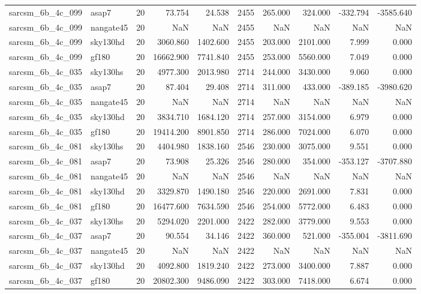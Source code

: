 \documentclass{article}
\begin{document}
\begin{longtable}{llrrrrrrrr}
sarcsm\_6b\_4c\_099 & asap7 & 20 & 73.754 & 24.538 & 2455 & 265.000 & 324.000 & -332.794 & -3585.640 \\
sarcsm\_6b\_4c\_099 & nangate45 & 20 & NaN & NaN & 2455 & NaN & NaN & NaN & NaN \\
sarcsm\_6b\_4c\_099 & sky130hd & 20 & 3060.860 & 1402.600 & 2455 & 203.000 & 2101.000 & 7.999 & 0.000 \\
sarcsm\_6b\_4c\_099 & gf180 & 20 & 16662.900 & 7741.840 & 2455 & 253.000 & 5560.000 & 7.049 & 0.000 \\
sarcsm\_6b\_4c\_035 & sky130hs & 20 & 4977.300 & 2013.980 & 2714 & 244.000 & 3430.000 & 9.060 & 0.000 \\
sarcsm\_6b\_4c\_035 & asap7 & 20 & 87.404 & 29.408 & 2714 & 311.000 & 433.000 & -389.185 & -3980.620 \\
sarcsm\_6b\_4c\_035 & nangate45 & 20 & NaN & NaN & 2714 & NaN & NaN & NaN & NaN \\
sarcsm\_6b\_4c\_035 & sky130hd & 20 & 3834.710 & 1684.120 & 2714 & 257.000 & 3154.000 & 6.979 & 0.000 \\
sarcsm\_6b\_4c\_035 & gf180 & 20 & 19414.200 & 8901.850 & 2714 & 286.000 & 7024.000 & 6.070 & 0.000 \\
sarcsm\_6b\_4c\_081 & sky130hs & 20 & 4404.980 & 1838.160 & 2546 & 230.000 & 3075.000 & 9.551 & 0.000 \\
sarcsm\_6b\_4c\_081 & asap7 & 20 & 73.908 & 25.326 & 2546 & 280.000 & 354.000 & -353.127 & -3707.880 \\
sarcsm\_6b\_4c\_081 & nangate45 & 20 & NaN & NaN & 2546 & NaN & NaN & NaN & NaN \\
sarcsm\_6b\_4c\_081 & sky130hd & 20 & 3329.870 & 1490.180 & 2546 & 220.000 & 2691.000 & 7.831 & 0.000 \\
sarcsm\_6b\_4c\_081 & gf180 & 20 & 16477.600 & 7634.590 & 2546 & 254.000 & 5772.000 & 6.483 & 0.000 \\
sarcsm\_6b\_4c\_037 & sky130hs & 20 & 5294.020 & 2201.000 & 2422 & 282.000 & 3779.000 & 9.553 & 0.000 \\
sarcsm\_6b\_4c\_037 & asap7 & 20 & 90.554 & 34.146 & 2422 & 360.000 & 521.000 & -355.004 & -3811.690 \\
sarcsm\_6b\_4c\_037 & nangate45 & 20 & NaN & NaN & 2422 & NaN & NaN & NaN & NaN \\
sarcsm\_6b\_4c\_037 & sky130hd & 20 & 4092.800 & 1819.240 & 2422 & 273.000 & 3400.000 & 7.887 & 0.000 \\
sarcsm\_6b\_4c\_037 & gf180 & 20 & 20802.300 & 9486.090 & 2422 & 303.000 & 7418.000 & 6.674 & 0.000 \\

\end{longtable}
\end{document}
